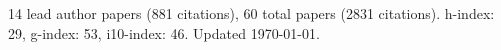 14 lead author papers (881 citations),
60 total papers (2831 citations).\newline
h-index: 29, g-index: 53, i10-index: 46. Updated \today.